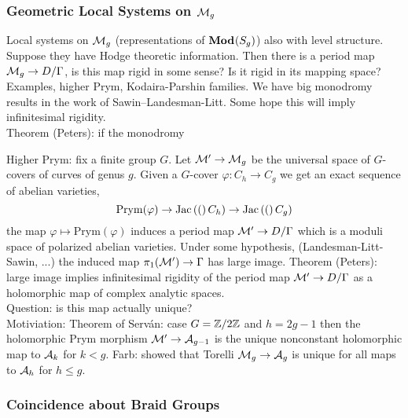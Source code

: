 \documentclass[12pt]{article}
\begin{document}
\subsubsection{Geometric Local Systems on $\mathcal{M}_g$}

Local systems on $\mathcal{M}_g$ (representations of $\mathbf{Mod}_{}(S_g)$) also with level structure. Suppose they have Hodge theoretic information. Then there is a period map $\mathcal{M}_g \to D / \Gamma$, is this map rigid in some sense? Is it rigid in its mapping space?
\\
Examples, higher Prym, Kodaira-Parshin families. We have big monodromy results in the work of Sawin--Landesman-Litt. Some hope this will imply infinitesimal rigidity. 
\\
Theorem (Peters): if the monodromy 


Higher Prym: fix a finite group $G$. Let $\mathcal{M}' \to \mathcal{M}_g$ be the universal space of $G$-covers of curves of genus $g$. Given a $G$-cover $\varphi : C_h \to C_g$ we get an exact sequence of abelian varieties,
\[ \mathrm{Prym}(\varphi) \to \mathrm{Jac}\left( ( \right)C_h) \to \mathrm{Jac}\left( ( \right)C_g) \]
the map $\varphi \mapsto \mathrm{Prym}(\varphi)$ induces a period map $\mathcal{M}' \to D / \Gamma$ which is a moduli space of polarized abelian varieties. Under some hypothesis, (Landesman-Litt-Sawin, ...) the induced map $\pi_1(\mathcal{M}') \to \Gamma$ has large image. Theorem (Peters): large image implies infinitesimal rigidity of the period map $\mathcal{M}' \to D / \Gamma$ as a holomorphic map of complex analytic spaces.
\\
Question: is this map actually unique? 
\\
Motiviation: Theorem of Serv\'{a}n: case $G = \mathbb{Z} / 2 \mathbb{Z}$ and $h = 2g - 1$ then the holomorphic Prym morphism $\mathcal{M}' \to \mathcal{A}_{g-1}$ is the unique nonconstant holomorphic map to $\mathcal{A}_{k}$ for $k < g$. Farb: showed that Torelli $\mathcal{M}_g \to \mathcal{A}_g$ is unique for all maps to $\mathcal{A}_h$ for $h \le g$. 

\subsubsection{Coincidence about Braid Groups}

\newcommand{\B}{\mathbb{B}}
\end{document}

